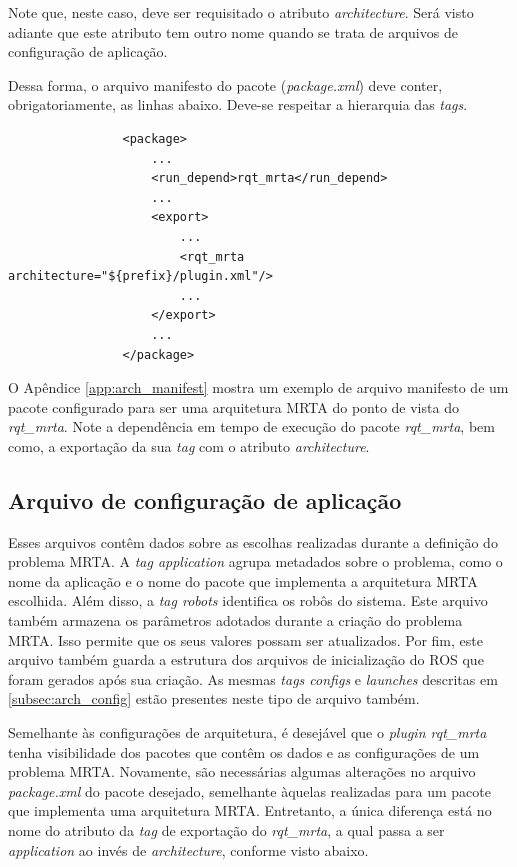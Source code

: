             Note que, neste caso, deve ser requisitado o atributo \textit{architecture}. Será visto adiante que este atributo tem outro nome quando se trata de arquivos de configuração de aplicação.
            
            Dessa forma, o arquivo manifesto do pacote (\textit{package.xml}) deve conter, obrigatoriamente, as linhas abaixo. Deve-se respeitar a hierarquia das \textit{tags}.
            
            \begin{lstlisting}
                <package>
                    ...
                    <run_depend>rqt_mrta</run_depend>
                    ...
                    <export>
                        ...
                        <rqt_mrta architecture="${prefix}/plugin.xml"/>
                        ...
                    </export>
                    ...
                </package>
            \end{lstlisting}
            
            O Apêndice \ref{app:arch_manifest} mostra um exemplo de arquivo manifesto de um pacote configurado para ser uma arquitetura MRTA do ponto de vista do \textit{rqt\_mrta}. Note a dependência em tempo de execução do pacote \textit{rqt\_mrta}, bem como, a exportação da sua \textit{tag} com o atributo \textit{architecture}.
        
        \subsection{Arquivo de configuração de aplicação} \label{subsec:app_config}
            Esses arquivos contêm dados sobre as escolhas realizadas durante a definição do problema MRTA. A \textit{tag application} agrupa metadados sobre o problema, como o nome da aplicação e o nome do pacote que implementa a arquitetura MRTA escolhida. Além disso, a \textit{tag robots} identifica os robôs do sistema. Este arquivo também armazena os parâmetros adotados durante a criação do problema MRTA. Isso permite que os seus valores possam ser atualizados. Por fim, este arquivo também guarda a estrutura dos arquivos de inicialização do ROS que foram gerados após sua criação. As mesmas \textit{tags configs} e \textit{launches} descritas em \ref{subsec:arch_config} estão presentes neste tipo de arquivo também.
        
            Semelhante às configurações de arquitetura, é desejável que o \textit{plugin rqt\_mrta} tenha visibilidade dos pacotes que contêm os dados e as configurações de um problema MRTA. Novamente, são necessárias algumas alterações no arquivo \textit{package.xml} do pacote desejado, semelhante àquelas realizadas para um pacote que implementa uma arquitetura MRTA. Entretanto, a única diferença está no nome do atributo da \textit{tag} de exportação do \textit{rqt\_mrta}, a qual passa a ser \textit{application} ao invés de \textit{architecture}, conforme visto abaixo.
            
